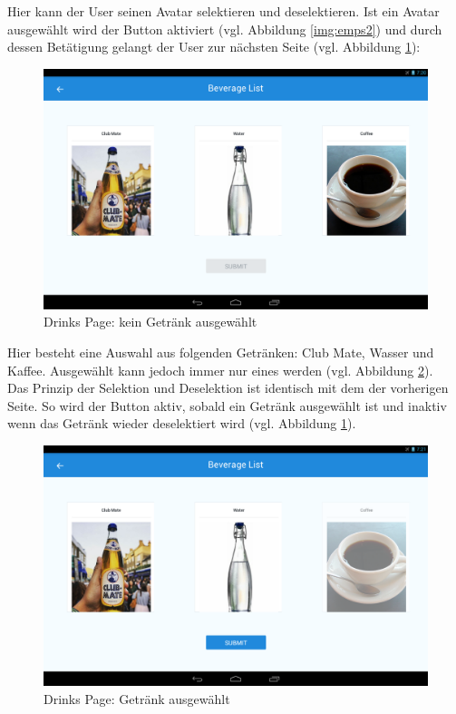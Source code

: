 Hier kann der User seinen Avatar selektieren und deselektieren. Ist ein Avatar ausgewählt wird der  Button aktiviert (vgl. Abbildung \ref{img:emps2}) und durch dessen Betätigung gelangt der User zur nächsten Seite (vgl. Abbildung \ref{img:drinks1}): 

\begin{figure}[th!]
	\centering
	\includegraphics[width=.9\columnwidth]{./Abbildungen/Kapitel_03/drinks1.png}
	\caption{Drinks Page: kein Getränk ausgewählt}
	\label{img:drinks1}
\end{figure}

Hier besteht eine Auswahl aus folgenden Getränken: Club Mate, Wasser und Kaffee. 
Ausgewählt kann jedoch immer nur eines werden (vgl. Abbildung \ref{img:drinks2}).\\
Das Prinzip der Selektion und Deselektion ist identisch mit dem der vorherigen Seite. So wird der  Button aktiv, sobald ein Getränk ausgewählt ist und inaktiv wenn das Getränk wieder deselektiert wird (vgl. Abbildung \ref{img:drinks1}).

\begin{figure}[th!]
	\centering
	\includegraphics[width=.9\columnwidth]{./Abbildungen/Kapitel_03/drinks2.png}
	\caption{Drinks Page: Getränk ausgewählt}
	\label{img:drinks2}
\end{figure}

